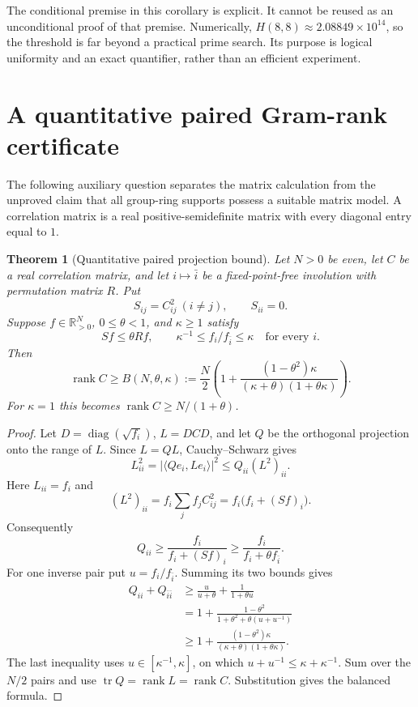 \documentclass[11pt,a4paper,oneside]{report}
\newtheorem{theorem}{Theorem}[section]
\theoremstyle{definition}
\theoremstyle{remark}
\DeclareMathOperator{\rank}{rank}
\DeclareMathOperator{\diag}{diag}
\DeclareMathOperator{\tr}{tr}
\begin{document}
The conditional premise in this corollary is explicit. It cannot be
reused as an unconditional proof of that premise. Numerically,
$H(8,8)\approx2.08849\times10^{14}$, so the threshold is far beyond
a practical prime search. Its purpose is logical uniformity and an exact
quantifier, rather than an efficient experiment.

\section{A quantitative paired Gram-rank certificate}\label{M01:sec:rank}

The following auxiliary question separates the matrix calculation from
the unproved claim that all group-ring supports possess a suitable
matrix model. A correlation matrix is a real positive-semidefinite
matrix with every diagonal entry equal to $1$.

\begin{theorem}[Quantitative paired projection bound]\label{M01:thm:rank}
Let $N>0$ be even, let $C$ be a real correlation matrix, and let
$i\mapsto\bar i$ be a fixed-point-free involution with permutation
matrix $R$. Put
\[
S_{ij}=C_{ij}^2\ (i\ne j),\qquad S_{ii}=0.
\]
Suppose $f\in\mathbb R_{>0}^{N}$, $0\le\theta<1$, and $\kappa\ge1$
satisfy
\begin{equation}\label{M01:eq:gramassumptions}
Sf\le\theta Rf,\qquad
\kappa^{-1}\le f_i/f_{\bar i}\le\kappa
\quad\text{for every }i.
\end{equation}
Then
\begin{equation}\label{M01:eq:grambound}
\boxed{\rank C\ge B(N,\theta,\kappa):=
\frac N2\left(1+
\frac{(1-\theta^2)\kappa}{(\kappa+\theta)(1+\theta\kappa)}\right).}
\end{equation}
For $\kappa=1$ this becomes $\rank C\ge N/(1+\theta)$.
\end{theorem}
\begin{proof}
Let $D=\diag(\sqrt{f_i})$, $L=DCD$, and let $Q$ be the orthogonal
projection onto the range of $L$. Since $L=QL$, Cauchy--Schwarz gives
\[
L_{ii}^2=|\langle Qe_i,Le_i\rangle|^2
\le Q_{ii}(L^2)_{ii}.
\]
Here $L_{ii}=f_i$ and
\[
(L^2)_{ii}=f_i\sum_j f_jC_{ij}^2
            =f_i\bigl(f_i+(Sf)_i\bigr).
\]
Consequently
\[
Q_{ii}\ge\frac{f_i}{f_i+(Sf)_i}
          \ge\frac{f_i}{f_i+\theta f_{\bar i}}.
\]
For one inverse pair put $u=f_i/f_{\bar i}$. Summing its two bounds
gives
\begin{align*}
Q_{ii}+Q_{\bar i\bar i}
&\ge\frac{u}{u+\theta}+\frac{1}{1+\theta u}\\
&=1+\frac{1-\theta^2}{1+\theta^2+\theta(u+u^{-1})}\\
&\ge1+\frac{(1-\theta^2)\kappa}
                 {(\kappa+\theta)(1+\theta\kappa)}.
\end{align*}
The last inequality uses $u\in[\kappa^{-1},\kappa]$, on which
$u+u^{-1}\le\kappa+\kappa^{-1}$. Sum over the $N/2$ pairs and use
$\tr Q=\rank L=\rank C$. Substitution gives the balanced formula.
\end{proof}
\end{document}
